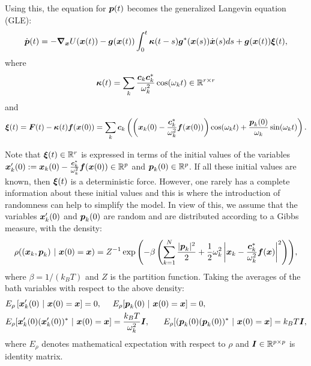 Using this, the equation for $\boldsymbol{p}(t)$ becomes the generalized Langevin equation (GLE):
\begin{equation} \label{deri_side}
\dot{\boldsymbol{p}}(t) = -\boldsymbol{\nabla}_{\boldsymbol{x}} U(\boldsymbol{x}(t))  - \boldsymbol{g}(\boldsymbol{x}(t))  \int_{0}^{t}  \boldsymbol{\kappa}(t-s) \boldsymbol{g}^*(\boldsymbol{x}(s)) \dot{\boldsymbol{x}}(s) ds    +  \boldsymbol{g}(\boldsymbol{x}(t)) \boldsymbol{\xi}(t),\end{equation}
where 
\begin{equation} \label{ham_memory}
\boldsymbol{\kappa}(t) = \sum_{k} \frac{\boldsymbol{c}_{k} \boldsymbol{c}_{k}^{*}}{ \omega_{k}^2} \cos(\omega_{k}t) \in \mathbb{R}^{r \times r} \end{equation} 
and 
\begin{equation}\boldsymbol{\xi}(t) = \boldsymbol{F}(t) - \boldsymbol{\kappa}(t) \boldsymbol{f}(\boldsymbol{x}(0)) =  \sum_{k} \boldsymbol{c}_{k} \left( \left( \boldsymbol{x}_{k}(0) - \frac{\boldsymbol{c}^*_{k}}{\omega_{k}^2} \boldsymbol{f}(\boldsymbol{x}(0)) \right) \cos(\omega_{k} t) + \frac{\boldsymbol{p}_{k}(0)}{ \omega_{k}} \sin(\omega_{k}t) \right). \end{equation}

Note that $\boldsymbol{\xi}(t) \in \mathbb{R}^r$ is expressed in terms of the initial values of the variables $\boldsymbol{x}'_{k}(0) := \boldsymbol{x}_{k}(0) - \frac{\boldsymbol{c}^*_{k}}{\omega_{k}^2} \boldsymbol{f}(\boldsymbol{x}(0)) \in \mathbb{R}^{p} $ and $\boldsymbol{p}_{k}(0)\in \mathbb{R}^{p}$. If all these initial values are known, then $\boldsymbol{\xi}(t)$ is a deterministic force. However,  one rarely has a complete information about these initial values and this is where the introduction of randomness can help to simplify the model. In view of this, we assume that the variables $\boldsymbol{x}'_k(0)$ and $\boldsymbol{p}_k(0)$ are random and are distributed according to a Gibbs measure, with the density:
\begin{equation}\rho((\vecc{x}_{k}, \vecc{p}_{k}) \ | \ \vecc{x}(0) = \vecc{x})  = Z^{-1} \exp{\left(-\beta \left(\sum_{k=1}^{N} \frac{|\vecc{p}_{k}|^2}{2} + \frac{1}{2} \omega_{k}^2 \left| \vecc{x}_{k}-\frac{\vecc{c}^*_{k}}{\omega_{k}^2}\vecc{f}(\vecc{x}) \right|^2 \right) \right)},\end{equation} where $\beta = 1/(k_{B}T)$ and $Z$ is the partition function. Taking the averages of the bath variables with respect to the above density:
\begin{align}
&E_{\rho}\left[ \boldsymbol{x}'_{k}(0)  \ |  \ \boldsymbol{x}(0) = \boldsymbol{x} \right] = 0, \ \ \  \ E_{\rho}[ \boldsymbol{p}_{k}(0) \ | \ \boldsymbol{x}(0) = \boldsymbol{x} ] = 0, \\
&E_{\rho} [ \boldsymbol{x}'_k(0) (\boldsymbol{x}'_{k}(0))^* \ | \ \boldsymbol{x}(0) = \boldsymbol{x} ] = \frac{k_{B}T}{\omega_{k}^2} \boldsymbol{I}, \ \  \ \ \ E_{\rho}[ (\boldsymbol{p}_{k}(0) (\boldsymbol{p}_k(0))^* \ | \ \boldsymbol{x}(0) = \boldsymbol{x} ] = k_{B}T \boldsymbol{I}, 
\end{align}
where $E_{\rho}$ denotes mathematical expectation with respect to $\rho$ and $\boldsymbol{I} \in \mathbb{R}^{p \times p}$ is identity matrix. 

